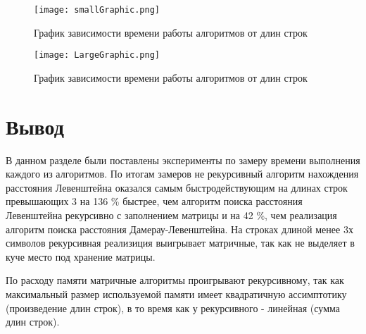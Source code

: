         \begin{figure}[h!]
            \centering
            \texttt{[image: smallGraphic.png]}
            \caption{График зависимости времени работы алгоритмов от длин строк}
            \label{graph:test:1}

            \texttt{[image: LargeGraphic.png]}
            \caption{График зависимости времени работы алгоритмов от длин строк}
            \label{graph:test:2}
        \end{figure}

    \section{Вывод}
        В данном разделе были поставлены эксперименты по замеру времени
        выполнения каждого из алгоритмов. По итогам замеров не рекурсивный 
        алгоритм нахождения расстояния Левенштейна оказался самым быстродействующим
        на длинах строк превышающих 3 на 136 \% быстрее, чем алгоритм поиска
        расстояния Левенштейна рекурсивно с заполнением матрицы и на 42 \%,
        чем реализация алгоритм поиска расстояния Дамерау-Левенштейна. На строках
        длиной менее 3х символов рекурсивная реализиция выигрывает матричные, так
        как не выделяет в куче место под хранение матрицы.  
        
        По расходу памяти матричные алгоритмы проигрывают рекурсивному, так как
        максимальный размер используемой памяти имеет квадратичную ассимптотику
        (произведение длин строк), в то время как у рекурсивного - линейная (сумма длин строк).


\newpage